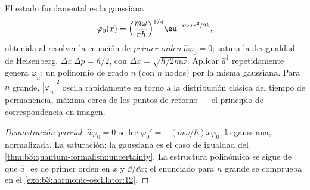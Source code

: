 \begin{proposition}\label{prop:b3:harmonic-oscillator:wavefunctions}
El estado fundamental es la gaussiana
\[
\varphi_0(x) = \Big(\frac{m\omega}{\pi\hbar}\Big)^{1/4}
\eu^{-m\omega x^2/2\hbar} ,
\]
obtenida al resolver la ecuación de \emph{primer orden} $\hat a\varphi_0
= 0$; satura la desigualdad de Heisenberg, $\Delta x\,\Delta p =
\hbar/2$, con $\Delta x = \sqrt{\hbar/2m\omega}$. Aplicar
$\hat a^\dagger$ repetidamente genera $\varphi_n$: un polinomio de
grado $n$ (con $n$ nodos) por la misma gaussiana. Para $n$ grande,
$|\varphi_n|^2$ oscila rápidamente en torno a la distribución clásica del
tiempo de permanencia, máxima cerca de los puntos de retorno --- el
principio de correspondencia en imagen.
\end{proposition}

\begin{proof}[Demostración parcial]
$\hat a\varphi_0 = 0$ se lee $\varphi_0' = -(m\omega/\hbar)x
\varphi_0$: la gaussiana, normalizada. La saturación: la gaussiana es
el caso de igualdad del \cref{thm:b3:quantum-formalism:uncertainty}.
La estructura polinómica se sigue de que $\hat a^\dagger$ es de primer
orden en $x$ y $\dd/\dd x$; el enunciado para $n$ grande se comprueba en el
\cref{exo:b3:harmonic-oscillator:12}.
\end{proof}

